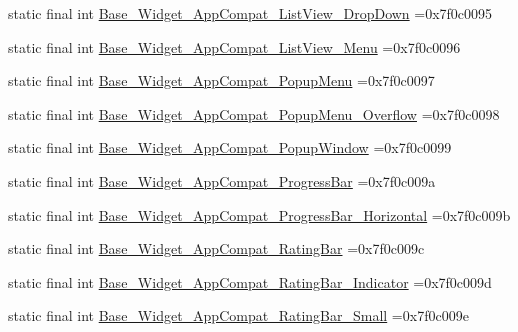 \begin{DoxyCompactItemize}
\item 
static final int \mbox{\hyperlink{classbr_1_1unb_1_1cic_1_1mp_1_1marketmaster_1_1test_1_1R_1_1style_a65bf772a8c63ab32c4b1f7a99cbfa012}{Base\+\_\+\+Widget\+\_\+\+App\+Compat\+\_\+\+List\+View\+\_\+\+Drop\+Down}} =0x7f0c0095
\item 
static final int \mbox{\hyperlink{classbr_1_1unb_1_1cic_1_1mp_1_1marketmaster_1_1test_1_1R_1_1style_a2a8410843b4111d9f2e5c92b15a6d515}{Base\+\_\+\+Widget\+\_\+\+App\+Compat\+\_\+\+List\+View\+\_\+\+Menu}} =0x7f0c0096
\item 
static final int \mbox{\hyperlink{classbr_1_1unb_1_1cic_1_1mp_1_1marketmaster_1_1test_1_1R_1_1style_ad8bad40c36299a621691ef556a151190}{Base\+\_\+\+Widget\+\_\+\+App\+Compat\+\_\+\+Popup\+Menu}} =0x7f0c0097
\item 
static final int \mbox{\hyperlink{classbr_1_1unb_1_1cic_1_1mp_1_1marketmaster_1_1test_1_1R_1_1style_af2c5093456c13a4f2c4bc861d6e6c757}{Base\+\_\+\+Widget\+\_\+\+App\+Compat\+\_\+\+Popup\+Menu\+\_\+\+Overflow}} =0x7f0c0098
\item 
static final int \mbox{\hyperlink{classbr_1_1unb_1_1cic_1_1mp_1_1marketmaster_1_1test_1_1R_1_1style_a38ab5c3d4a475355cc4f227425b68c83}{Base\+\_\+\+Widget\+\_\+\+App\+Compat\+\_\+\+Popup\+Window}} =0x7f0c0099
\item 
static final int \mbox{\hyperlink{classbr_1_1unb_1_1cic_1_1mp_1_1marketmaster_1_1test_1_1R_1_1style_afbde62464b0256874d4205e61a5e37a9}{Base\+\_\+\+Widget\+\_\+\+App\+Compat\+\_\+\+Progress\+Bar}} =0x7f0c009a
\item 
static final int \mbox{\hyperlink{classbr_1_1unb_1_1cic_1_1mp_1_1marketmaster_1_1test_1_1R_1_1style_abf2b395f35178baa76eb827e0376c77e}{Base\+\_\+\+Widget\+\_\+\+App\+Compat\+\_\+\+Progress\+Bar\+\_\+\+Horizontal}} =0x7f0c009b
\item 
static final int \mbox{\hyperlink{classbr_1_1unb_1_1cic_1_1mp_1_1marketmaster_1_1test_1_1R_1_1style_a6286bc403e025835893fd79359bcbfea}{Base\+\_\+\+Widget\+\_\+\+App\+Compat\+\_\+\+Rating\+Bar}} =0x7f0c009c
\item 
static final int \mbox{\hyperlink{classbr_1_1unb_1_1cic_1_1mp_1_1marketmaster_1_1test_1_1R_1_1style_abcc9be34fe31cf7218107ec77a624485}{Base\+\_\+\+Widget\+\_\+\+App\+Compat\+\_\+\+Rating\+Bar\+\_\+\+Indicator}} =0x7f0c009d
\item 
static final int \mbox{\hyperlink{classbr_1_1unb_1_1cic_1_1mp_1_1marketmaster_1_1test_1_1R_1_1style_a35e2b171eb716759137e9ad728c0be8b}{Base\+\_\+\+Widget\+\_\+\+App\+Compat\+\_\+\+Rating\+Bar\+\_\+\+Small}} =0x7f0c009e

\end{DoxyCompactItemize}
